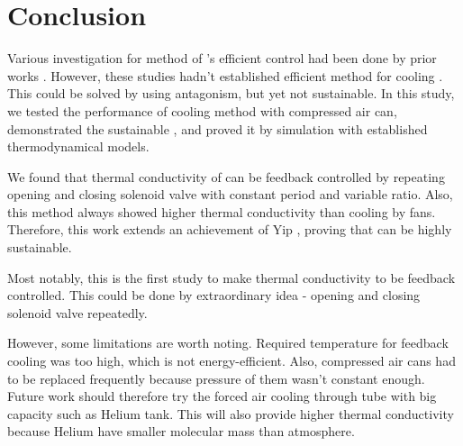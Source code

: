 \section{Conclusion}
Various investigation for method of \scp's efficient control had been done by prior works \cite{haines,mirvakili,yip}. %
However, these studies hadn't established efficient method for cooling \scp. %
This could be solved by using antagonism, but yet not sustainable.
In this study, we tested the performance of cooling method with compressed air can, demonstrated the sustainable \apcnospace, and proved it by simulation with established thermodynamical models. %

We found that thermal conductivity of \scp can be feedback controlled by repeating opening and closing solenoid valve with constant period and variable ratio. %
Also, this method always showed higher thermal conductivity than cooling by fans.
Therefore, this work extends an achievement of Yip \etal, proving that \apc can be highly sustainable.

Most notably, this is the first study to make thermal conductivity to be feedback controlled. This could be done by extraordinary idea - opening and closing solenoid valve repeatedly.

However, some limitations are worth noting. Required temperature for feedback cooling was too high, which is not energy-efficient.
Also, compressed air cans had to be replaced frequently because pressure of them wasn't constant enough. 
Future work should therefore try the forced air cooling through tube with big capacity such as Helium tank. 
This will also provide higher thermal conductivity because Helium have smaller molecular mass than atmosphere.


